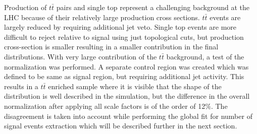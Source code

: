 Production of $t\bar{t}$ pairs and single top represent a challenging background at the LHC because of their relatively large production cross sections. $t\bar{t}$ events are largely reduced by requiring additional jet veto. Single top events are more difficult to reject relative to signal using just topological cuts, but production cross-section is smaller resulting in a smaller contribution in the final distributions.
With very large contribution of the $t\bar{t}$ background, a test of the normalization was performed. A separate control region was created which was defined to be same as signal region, but requiring additional jet activity. This results in a $t\bar{t}$ enriched sample where it is visible that the shape of the distribution is well described in the simulation, but the difference in the overall normalization after applying all scale factors is of the order of 12$\%$. The disagreement is taken into account while performing the global fit for number of signal events extraction which will be described further in the next section. 
